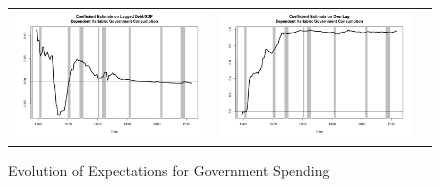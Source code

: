 \documentclass[12pt]{article}
\begin{document}
\begin{figure}\caption{Evolution of Expectations for Government Spending}\label{fg:exp_gov}
\begin{center}
\hspace*{-0.2in}\begin{tabular}{ccc}
\includegraphics[scale=0.34]{pics/coef_govcons_debt.png} & \includegraphics[scale=0.34]{pics/coef_govcons_lag.png} \\

\end{tabular}
\end{center}
\end{figure}
\end{document}
